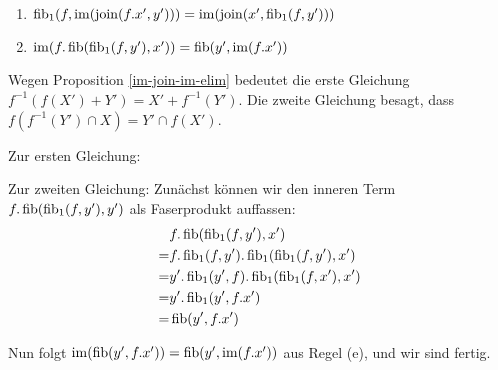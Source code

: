 \begin{lemm} $\quad$ %
\begin{enumerate}
\item $\operatorname{fib}_1(f,\operatorname{im}(\operatorname{join}(f.x',y'))) = \operatorname{im}(\operatorname{join}(x',\operatorname{fib}_1(f,y')))$
\item $\operatorname{im}(f.\operatorname{fib}(\operatorname{fib}_1(f,y'),x')) = \operatorname{fib}(y',\operatorname{im}(f.x'))$
\end{enumerate}
Wegen Proposition \ref{im-join-im-elim} bedeutet die erste Gleichung $f^{-1}(f(X')+Y') = X' + f^{-1}(Y')$.
Die zweite Gleichung besagt, dass $f(f^{-1}(Y')\cap X) = Y' \cap f(X')$.
\end{lemm}
\begin{bew}

Zur ersten Gleichung:


Zur zweiten Gleichung:
Zunächst können wir den inneren Term $f.\operatorname{fib}(\operatorname{fib}_1(f,y'),y')$ als Faserprodukt auffassen:
\begin{align*}
   & f.\operatorname{fib}(\operatorname{fib}_1(f,y'),x')
\\=& f.\operatorname{fib}_1(f,y').\operatorname{fib}_1(\operatorname{fib}_1(f,y'),x')
\\=& y'.\operatorname{fib}_1(y',f).\operatorname{fib}_1(\operatorname{fib}_1(f,x'),x')
\\=& y'.\operatorname{fib}_1(y',f.x')
\\=& \operatorname{fib}(y',f.x')
\end{align*}

Nun folgt $\operatorname{im}(\operatorname{fib}(y',f.x')) = \operatorname{fib}(y',\operatorname{im}(f.x'))$ aus Regel (e), und wir sind fertig.
\end{bew}
